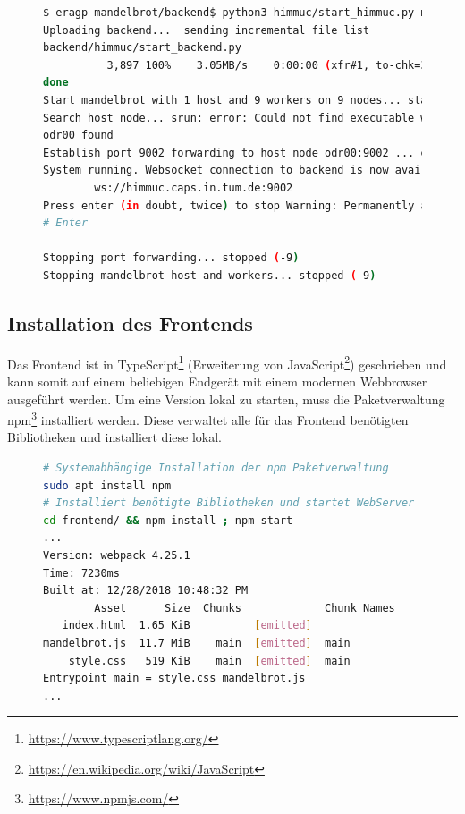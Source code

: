 \begin{figure}
	\begin{lstlisting}[language=bash, caption={Beispielausgabe bei Start der Entwicklungsumbegung auf dem HimMUC}, label={shell:start_himmuc_example}]
$ eragp-mandelbrot/backend$ python3 himmuc/start_himmuc.py muendler 10 9
Uploading backend...  sending incremental file list
backend/himmuc/start_backend.py
          3,897 100%    3.05MB/s    0:00:00 (xfr#1, to-chk=35/62)
done
Start mandelbrot with 1 host and 9 workers on 9 nodes... started mandelbrot
Search host node... srun: error: Could not find executable worker
odr00 found
Establish port 9002 forwarding to host node odr00:9002 ... established
System running. Websocket connection to backend is now available at
        ws://himmuc.caps.in.tum.de:9002
Press enter (in doubt, twice) to stop Warning: Permanently added the ED25519 host key for IP address '10.42.0.54' to the list of known hosts.
# Enter

Stopping port forwarding... stopped (-9)
Stopping mandelbrot host and workers... stopped (-9)
    \end{lstlisting}
\end{figure}

\subsection{Installation des Frontends}
Das Frontend ist in TypeScript\footnote{\url{https://www.typescriptlang.org/}} (Erweiterung von JavaScript\footnote{\url{https://en.wikipedia.org/wiki/JavaScript}})
geschrieben und kann somit auf einem beliebigen Endgerät mit einem modernen Webbrowser ausgeführt werden.
Um eine Version lokal zu starten, muss die Paketverwaltung npm\footnote{\url{https://www.npmjs.com/}} installiert werden. Diese verwaltet alle
für das Frontend benötigten Bibliotheken und installiert diese lokal.

\begin{figure}[h!]
	\begin{lstlisting}[language=bash, caption={Starten des Frontends mit beispielhafter Ausgabe}]
# Systemabhängige Installation der npm Paketverwaltung
sudo apt install npm
# Installiert benötigte Bibliotheken und startet WebServer
cd frontend/ && npm install ; npm start
...
Version: webpack 4.25.1
Time: 7230ms
Built at: 12/28/2018 10:48:32 PM
        Asset      Size  Chunks             Chunk Names
   index.html  1.65 KiB          [emitted]
mandelbrot.js  11.7 MiB    main  [emitted]  main
    style.css   519 KiB    main  [emitted]  main
Entrypoint main = style.css mandelbrot.js
...
        \end{lstlisting}
\end{figure}

